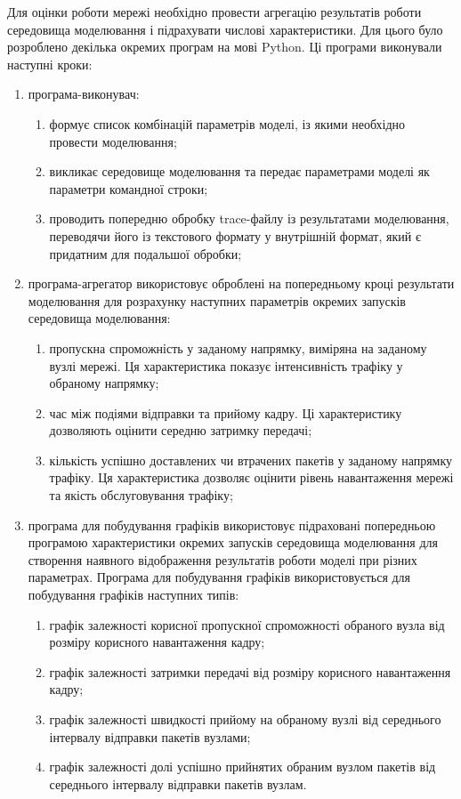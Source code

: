 \documentclass[a4paper,ukrainian,utf8,nocolumnsxix,nocolumnxxxii,nocolumnxxxi,floatsection,equationsection]{eskdtext}
\begin{document}
Для оцінки роботи мережі необхідно провести агрегацію результатів роботи середовища моделювання і підрахувати числові характеристики. Для цього було розроблено декілька окремих програм на мові Python. Ці програми виконували наступні кроки:
\begin{enumerate}
	\item програма-виконувач:
	\begin{enumerate}
		\item формує список комбінацій параметрів моделі, із якими необхідно провести моделювання;
		\item викликає середовище моделювання та передає параметрами моделі як параметри командної строки;
		\item проводить попередню обробку trace-файлу із результатами моделювання, переводячи його із текстового формату у внутрішній формат, який є придатним для подальшої обробки;
	\end{enumerate}

	\item програма-агрегатор використовує оброблені на попередньому кроці результати моделювання для розрахунку наступних параметрів окремих запусків середовища моделювання:
	\begin{enumerate}
		\item пропускна спроможність у заданому напрямку, виміряна на заданому вузлі мережі. Ця характеристика показує інтенсивність трафіку у обраному напрямку;
		\item час між подіями відправки та прийому кадру. Ці характеристику дозволяють оцінити середню затримку передачі;
		\item кількість успішно доставлених чи втрачених пакетів у заданому напрямку трафіку. Ця характеристика дозволяє оцінити рівень навантаження мережі та якість обслуговування трафіку;
	\end{enumerate}

	\item програма для побудування графіків використовує підраховані попередньою програмою характеристики окремих запусків середовища моделювання для створення наявного відображення результатів роботи моделі при різних параметрах. Програма для побудування графіків використовується для побудування графіків наступних типів:
	\begin{enumerate}
		\item графік залежності корисної пропускної спроможності обраного вузла від розміру корисного навантаження кадру;
		\item графік залежності затримки передачі від розміру корисного навантаження кадру;
		\item графік залежності швидкості прийому на обраному вузлі від середнього інтервалу відправки пакетів вузлами;
		\item графік залежності долі успішно прийнятих обраним вузлом пакетів від середнього інтервалу відправки пакетів вузлам.
	\end{enumerate}
\end{enumerate}
\end{document}

